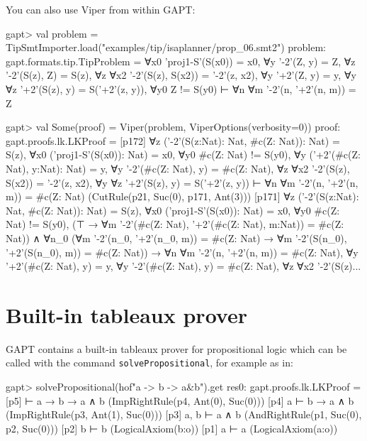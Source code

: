 \documentclass[a4paper,11pt]{book}
\begin{document}
You can also use Viper from within GAPT:
\begin{clilisting}
gapt> val problem = TipSmtImporter.load("examples/tip/isaplanner/prop_06.smt2")
problem: gapt.formats.tip.TipProblem =
∀x0 'proj1-S'(S(x0)) = x0,
∀y '-2'(Z, y) = Z,
∀z '-2'(S(z), Z) = S(z),
∀z ∀x2 '-2'(S(z), S(x2)) = '-2'(z, x2),
∀y '+2'(Z, y) = y,
∀y ∀z '+2'(S(z), y) = S('+2'(z, y)),
∀y0 Z != S(y0)
⊢
∀n ∀m '-2'(n, '+2'(n, m)) = Z

gapt> val Some(proof) = Viper(problem, ViperOptions(verbosity=0))
proof: gapt.proofs.lk.LKProof =
[p172] ∀z ('-2'(S(z:Nat): Nat, #c(Z: Nat)): Nat) = S(z),
∀x0 ('proj1-S'(S(x0)): Nat) = x0,
∀y0 #c(Z: Nat) != S(y0),
∀y ('+2'(#c(Z: Nat), y:Nat): Nat) = y,
∀y '-2'(#c(Z: Nat), y) = #c(Z: Nat),
∀z ∀x2 '-2'(S(z), S(x2)) = '-2'(z, x2),
∀y ∀z '+2'(S(z), y) = S('+2'(z, y))
⊢
∀n ∀m '-2'(n, '+2'(n, m)) = #c(Z: Nat)    (CutRule(p21, Suc(0), p171, Ant(3)))
[p171] ∀z ('-2'(S(z:Nat): Nat, #c(Z: Nat)): Nat) = S(z),
∀x0 ('proj1-S'(S(x0)): Nat) = x0,
∀y0 #c(Z: Nat) != S(y0),
(⊤ → ∀m '-2'(#c(Z: Nat), '+2'(#c(Z: Nat), m:Nat)) = #c(Z: Nat)) ∧
    ∀n_0
    (∀m '-2'(n_0, '+2'(n_0, m)) = #c(Z: Nat) →
      ∀m '-2'(S(n_0), '+2'(S(n_0), m)) = #c(Z: Nat)) →
  ∀n ∀m '-2'(n, '+2'(n, m)) = #c(Z: Nat),
∀y '+2'(#c(Z: Nat), y) = y,
∀y '-2'(#c(Z: Nat), y) = #c(Z: Nat),
∀z ∀x2 '-2'(S(z)...

\end{clilisting}

\section{Built-in tableaux prover}

GAPT contains a built-in tableaux prover for propositional logic
which can be called with the command \texttt{solvePropositional}, for example as in:
\begin{clilisting}
gapt> solvePropositional(hof"a -> b -> a&b").get
res0: gapt.proofs.lk.LKProof =
[p5]  ⊢ a → b → a ∧ b    (ImpRightRule(p4, Ant(0), Suc(0)))
[p4] a ⊢ b → a ∧ b    (ImpRightRule(p3, Ant(1), Suc(0)))
[p3] a, b ⊢ a ∧ b    (AndRightRule(p1, Suc(0), p2, Suc(0)))
[p2] b ⊢ b    (LogicalAxiom(b:o))
[p1] a ⊢ a    (LogicalAxiom(a:o))

\end{clilisting}
\end{document}
